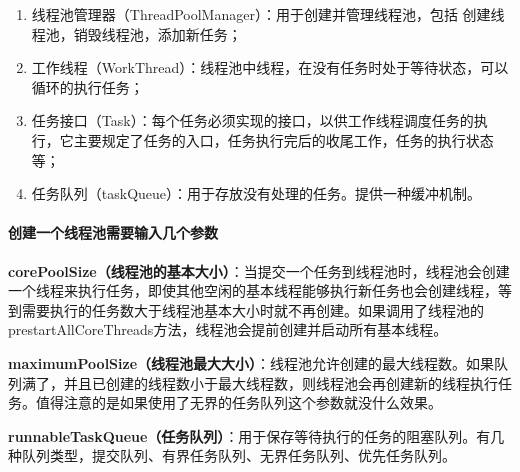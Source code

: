 \documentclass[../../../interview-questions.tex]{subfiles}
\begin{document}
\begin{enumerate}
    \item {线程池管理器（ThreadPoolManager）：用于创建并管理线程池，包括 创建线程池，销毁线程池，添加新任务；}
    \item {工作线程（WorkThread）：线程池中线程，在没有任务时处于等待状态，可以循环的执行任务；}
    \item {任务接口（Task）：每个任务必须实现的接口，以供工作线程调度任务的执行，它主要规定了任务的入口，任务执行完后的收尾工作，任务的执行状态等；}
    \item {任务队列（taskQueue）：用于存放没有处理的任务。提供一种缓冲机制。}
\end{enumerate}


\paragraph{创建一个线程池需要输入几个参数}

\textbf{corePoolSize（线程池的基本大小）}：当提交一个任务到线程池时，线程池会创建一个线程来执行任务，即使其他空闲的基本线程能够执行新任务也会创建线程，等到需要执行的任务数大于线程池基本大小时就不再创建。如果调用了线程池的prestartAllCoreThreads方法，线程池会提前创建并启动所有基本线程。

\textbf{maximumPoolSize（线程池最大大小）}：线程池允许创建的最大线程数。如果队列满了，并且已创建的线程数小于最大线程数，则线程池会再创建新的线程执行任务。值得注意的是如果使用了无界的任务队列这个参数就没什么效果。

\textbf{runnableTaskQueue（任务队列）}：用于保存等待执行的任务的阻塞队列。有几种队列类型，提交队列、有界任务队列、无界任务队列、优先任务队列。
\end{document}

